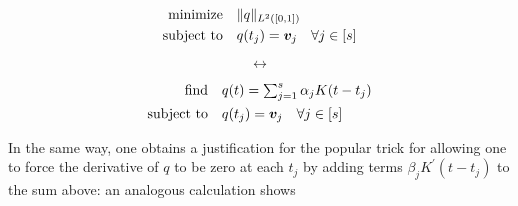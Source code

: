 \documentclass[11pt]{article}
\newcommand{\HS}{\hspace{3.5mm}}
\newcommand{\bv}{\bm v}
\begin{document}
\noindent
\begin{minipage}{.48\linewidth}
    \vspace{0.5cm}
\begin{equation*}
\begin{aligned}
  \text{minimize} &\HS \|q\|_{L^2([0, 1])} \\
  \text{subject to} &\HS q(t_j) = \bv_j \HS \forall j \in [s]
\end{aligned}
\end{equation*}
\end{minipage}
\begin{minipage}{.04\linewidth}
    \begin{equation*}
        \leftrightarrow
    \end{equation*}
\end{minipage}
\begin{minipage}{.48\linewidth}
\begin{equation}
\begin{aligned}
  \text{find} &\HS q(t) = \textstyle\sum_{j = 1}^s \alpha_jK(t - t_j) \\
  \text{subject to} &\HS q(t_j) = \bv_j \HS \forall j \in [s]
\end{aligned}
\end{equation}
\end{minipage}
\vspace{1em}

In the same way, one obtains a justification for the popular trick for allowing one to force the derivative of $q$ to be zero at each $t_j$ by adding terms $\beta_jK^\prime(t - t_j)$ to the sum above: an analogous calculation shows
\end{document}
